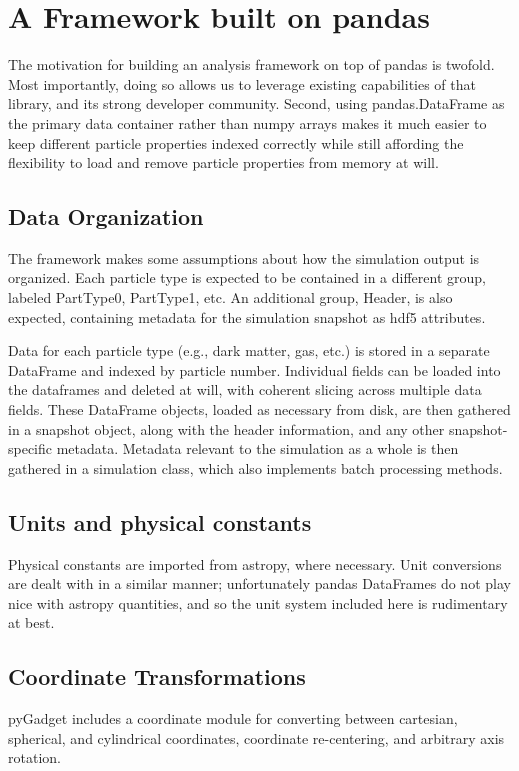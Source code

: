 \section{A Framework built on pandas}
\label{framework}

The motivation for building an analysis framework on top of pandas is twofold.  Most importantly, doing so allows us to leverage existing capabilities of that library, and its strong developer community.  Second, using pandas.DataFrame as the primary data container rather than numpy arrays makes it much easier to keep different particle properties indexed correctly while still affording the flexibility to load and remove particle properties from memory at will.

\subsection{Data Organization}
\label{hierarchy}
The framework makes some assumptions about how the simulation output is organized.  Each particle type is expected to be contained in a different group, labeled PartType0, PartType1, etc. An additional group, Header, is also expected, containing metadata for the simulation snapshot as hdf5 attributes.  

Data for each particle type (e.g., dark matter, gas, etc.) is stored in a separate DataFrame and indexed by particle number.  Individual fields can be loaded into the dataframes and deleted at will, with coherent slicing across multiple data fields.   These DataFrame objects, loaded as necessary from disk, are then gathered in a snapshot object, along with the header information, and any other snapshot-specific metadata.  Metadata relevant to the simulation as a whole is then gathered in a simulation class, which also implements batch processing methods.

\subsection{Units and physical constants}
\label{units}
Physical constants are imported from astropy, where necessary.  Unit conversions are dealt with in a similar manner; unfortunately pandas DataFrames do not play nice with astropy quantities, and so the unit system included here is rudimentary at best.

\subsection{Coordinate Transformations}
\label{coordinates}
pyGadget includes a coordinate module for converting between cartesian, spherical, and cylindrical coordinates, coordinate re-centering, and arbitrary axis rotation.